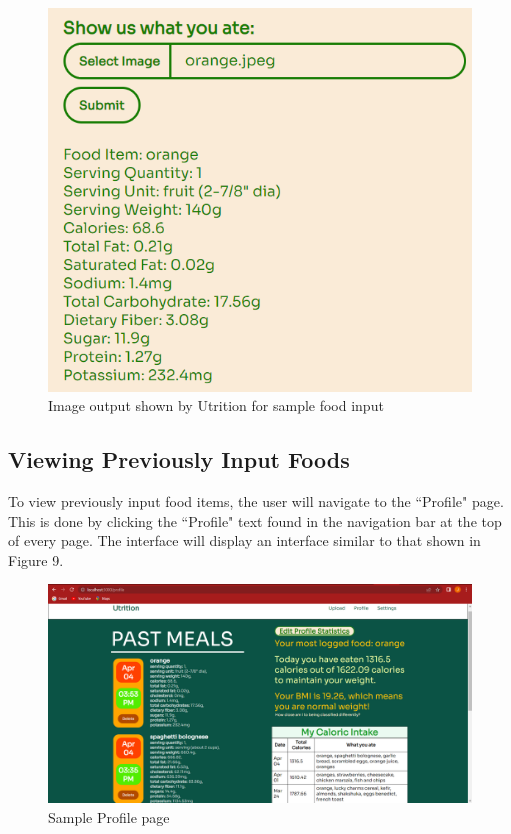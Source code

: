 \documentclass{article}
\begin{document}
\begin{figure}[H]
	\centering
	\includegraphics[scale=0.70]{sampleoutputimage.png}
	\caption{Image output shown by Utrition for sample food input}
\end{figure}

\subsection{Viewing Previously Input Foods}
To view previously input food items, the user will navigate to the ``Profile" page. This is done by clicking the ``Profile" text found in the navigation bar at the top of every page. The interface will display an interface similar to that shown in Figure 9.

\begin{figure}[H]
	\centering
	\includegraphics[scale=0.30]{profilepage.png}
	\caption{Sample Profile page}
\end{figure}
\end{document}
